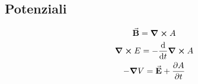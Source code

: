 \documentclass[a4paper]{article}
\begin{document}
\subsection{Potenziali}
\begin{gather}
    \va B = \curl{A} \\
    \curl{E} = -\dv{t}\curl{A}\\
    -\grad{V} = \va E + \pdv{A}{t}
\end{gather}
\end{document}
